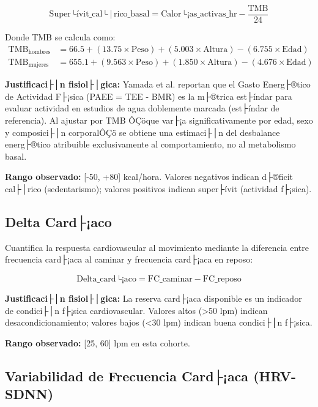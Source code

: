 \begin{equation}
\text{Super├ívit\_cal├│rico\_basal} = \text{Calor├¡as\_activas\_hr} - \frac{\text{TMB}}{24}
\label{eq:superavit_calorico}
\end{equation}

Donde TMB se calcula como:
\begin{align}
\text{TMB}_{\text{hombres}} &= 66.5 + (13.75 \times \text{Peso}) + (5.003 \times \text{Altura}) - (6.755 \times \text{Edad}) \\
\text{TMB}_{\text{mujeres}} &= 655.1 + (9.563 \times \text{Peso}) + (1.850 \times \text{Altura}) - (4.676 \times \text{Edad})
\end{align}

\textbf{Justificaci├│n fisiol├│gica:} Yamada et al. \cite{Yamada2019} reportan que el Gasto Energ├®tico de Actividad F├¡sica (PAEE = TEE - BMR) es la m├®trica est├índar para evaluar actividad en estudios de agua doblemente marcada (est├índar de referencia). Al ajustar por TMB ÔÇöque var├¡a significativamente por edad, sexo y composici├│n corporalÔÇö se obtiene una estimaci├│n del desbalance energ├®tico atribuible exclusivamente al comportamiento, no al metabolismo basal.

\textbf{Rango observado:} [-50, +80] kcal/hora. Valores negativos indican d├®ficit cal├│rico (sedentarismo); valores positivos indican super├ívit (actividad f├¡sica).

\subsection{Delta Card├¡aco}
\label{subsec:delta_cardiaco}

Cuantifica la respuesta cardiovascular al movimiento mediante la diferencia entre frecuencia card├¡aca al caminar y frecuencia card├¡aca en reposo:

\begin{equation}
\text{Delta\_card├¡aco} = \text{FC\_caminar} - \text{FC\_reposo}
\label{eq:delta_cardiaco}
\end{equation}

\textbf{Justificaci├│n fisiol├│gica:} La reserva card├¡aca disponible es un indicador de condici├│n f├¡sica cardiovascular. Valores altos (>50 lpm) indican desacondicionamiento; valores bajos (<30 lpm) indican buena condici├│n f├¡sica.

\textbf{Rango observado:} [25, 60] lpm en esta cohorte.

\subsection{Variabilidad de Frecuencia Card├¡aca (HRV-SDNN)}
\label{subsec:hrv_sdnn}

